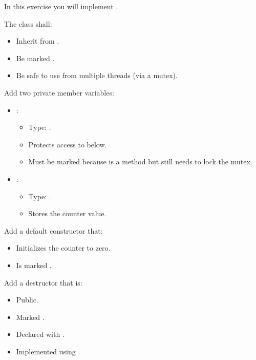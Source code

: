 \label{c6:ex:4.2}
In this exercise you will implement .

The class shall:
\begin{itemize}
  \item Inherit from .
  \item Be marked .
  \item Be safe to use from multiple threads (via a mutex).
\end{itemize}

Add two private member variables:
\begin{itemize}
  \item {}:
  \begin{itemize}
    \item Type: .
    \item Protects access to  below.
    \item Must be marked  because  is a  method but still
      needs to lock the mutex.
  \end{itemize}
  \item {}:
  \begin{itemize}
    \item Type: .
    \item Stores the counter value.
  \end{itemize}
\end{itemize}

Add a default constructor that:
\begin{itemize}
  \item Initializes the counter to zero.
  \item Is marked .
\end{itemize}

Add a destructor that is:
\begin{itemize}
  \item Public.
  \item Marked .
  \item Declared with .
  \item Implemented using .
\end{itemize}

